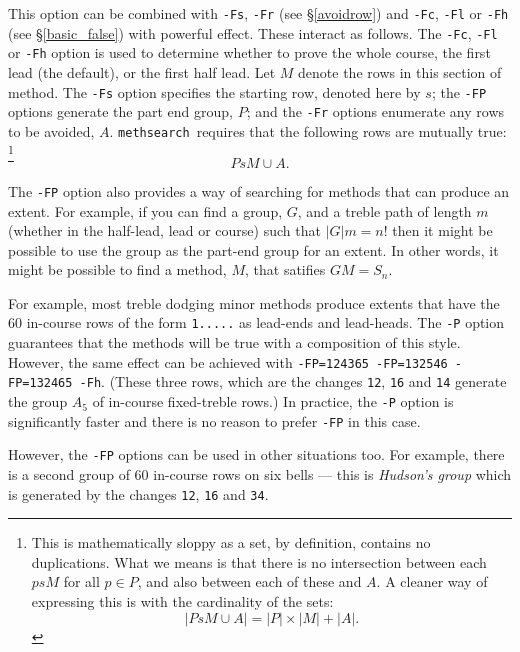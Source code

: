 \documentclass[a4paper,11pt,oneside]{book}
\makeatletter
\def\textitidx#1{\textit{#1}\index{#1}}
\newcommand{\oi}[1]{\index{#1@{\hspace*{-\optwidth}\texttt{-}\texttt{#1}}}}
\def\methsearch{\texttt{meth\-search}}
\newcommand{\sref}[1]{\hyperref[#1]{\S\ref{#1}}}
\makeatother
\begin{document}
This option can be combined with \verb+-Fs+,\oi{Fs} \verb+-Fr+\oi{Fr} 
(see \sref{avoidrow}) and \verb+-Fc+,\oi{Fc} \verb+-Fl+\oi{Fl} or 
\verb+-Fh+\oi{Fh} (see \sref{basic_false}) with powerful effect.  
These interact as follows.
The \verb+-Fc+, \verb+-Fl+ or \verb+-Fh+ option is used to determine whether
to prove the whole course, the first lead (the default), or the first half
lead.  Let $M$ denote the rows in this section of method.
The \verb+-Fs+ option specifies the starting row, denoted here by $s$;
the \verb+-FP+ options generate the part end group, $P$; and 
the \verb+-Fr+ options enumerate any rows to be avoided, $A$.
\methsearch\ requires that the following rows are mutually true:%
\footnote{This is mathematically sloppy as a set, by definition,
contains no duplications.  What we means is that there is no intersection
between each $psM$ for all $p \in P$, and also between each of these and $A$.
A cleaner way of expressing this is with the cardinality%
 of the sets: 
\[ \left| P s M \cup A \right| 
 = \left|P\right| \times \left|M\right| + \left|A\right|. \]
} %
\[ PsM \cup A. \]

The \verb+-FP+ option also provides a way of searching for methods that
can produce an extent.
For example, if you can find a group, $G$, and a treble path of length $m$ 
(whether in the half-lead, lead or course) such that $\left|G\right|m = n!$
then it might be possible to use the group as the part-end group for an extent.
In other words, it might be possible to find a method, $M$, that satifies
$GM=S_n$.  

For example, most treble dodging minor methods produce extents
that have the {60} in-course rows of the form \verb+1.....+ as lead-ends
and lead-heads.  The \verb+-P+ option guarantees that the methods will be
true with a composition of this style.  However, the same effect can be 
achieved with \verb+-FP=124365 -FP=132546 -FP=132465 -Fh+.  (These three 
rows, which are the changes \verb+12+, \verb+16+ and \verb+14+ generate
the group $A_5$ of in-course fixed-treble rows.)  In practice, the \verb+-P+
option is significantly faster and there is no reason to prefer \verb+-FP+
in this case.\oi{P}

However, the \verb+-FP+ options can be used in other situations too.  For
example, there is a second group of {60} in-course rows on six bells ---
this is \textitidx{Hudson's group} which is generated by the changes
\verb+12+, \verb+16+ and \verb+34+.
\end{document}
